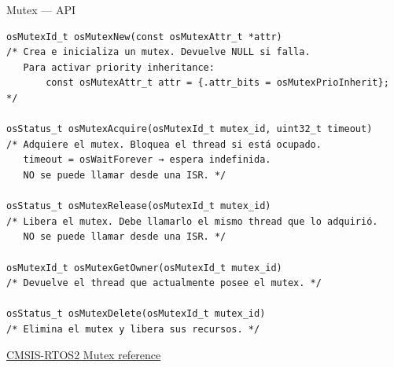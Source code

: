 \begin{frame}[fragile]{Mutex — API}
    \begin{verbatim}
osMutexId_t osMutexNew(const osMutexAttr_t *attr)
/* Crea e inicializa un mutex. Devuelve NULL si falla.
   Para activar priority inheritance:
       const osMutexAttr_t attr = {.attr_bits = osMutexPrioInherit};  */

osStatus_t osMutexAcquire(osMutexId_t mutex_id, uint32_t timeout)
/* Adquiere el mutex. Bloquea el thread si está ocupado.
   timeout = osWaitForever → espera indefinida.
   NO se puede llamar desde una ISR. */

osStatus_t osMutexRelease(osMutexId_t mutex_id)
/* Libera el mutex. Debe llamarlo el mismo thread que lo adquirió.
   NO se puede llamar desde una ISR. */

osMutexId_t osMutexGetOwner(osMutexId_t mutex_id)
/* Devuelve el thread que actualmente posee el mutex. */

osStatus_t osMutexDelete(osMutexId_t mutex_id)
/* Elimina el mutex y libera sus recursos. */
    \end{verbatim}
    \vspace{4pt}
    \href{https://arm-software.github.io/CMSIS_5/RTOS2/html/group__CMSIS__RTOS__MutexMgmt.html}
    {CMSIS-RTOS2 Mutex reference}
\end{frame}



